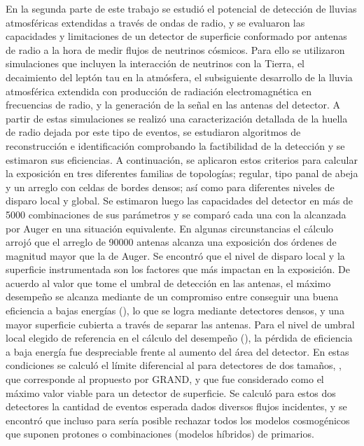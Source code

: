En la segunda parte de este trabajo se estudi\'o el potencial de detecci\'on de  lluvias atmosf\'ericas extendidas a trav\'es de ondas de radio,
y se evaluaron las capacidades y limitaciones de un detector de superficie conformado por antenas de radio a la hora de medir flujos de neutrinos c\'osmicos.
Para ello se utilizaron simulaciones que incluyen la interacci\'on de neutrinos con la Tierra, el decaimiento del lept\'on tau en la atm\'osfera, el subsiguiente desarrollo de la lluvia atmosf\'erica extendida con producci\'on de radiaci\'on electromagn\'etica en frecuencias de radio, y la generaci\'on de la se\~nal en las antenas del detector.
A partir de estas simulaciones se realiz\'o una caracterizaci\'on detallada de la huella de radio dejada por este tipo de eventos, 
se estudiaron algoritmos de reconstrucci\'on e identificaci\'on comprobando la factibilidad de la detecci\'on y se estimaron sus eficiencias.
A continuaci\'on, se aplicaron estos criterios para calcular la exposici\'on en tres diferentes familias de topolog\'ias; regular, tipo panal de abeja y un arreglo con celdas de bordes densos; as\'i como para diferentes niveles de disparo local y global.
Se estimaron luego las capacidades del detector en m\'as de 5000 combinaciones de sus par\'ametros y se compar\'o cada una con la alcanzada por Auger en una situaci\'on equivalente.
En algunas circunstancias el c\'alculo arroj\'o que el arreglo de 90000 antenas alcanza una exposici\'on dos \'ordenes de magnitud mayor que la de Auger.
Se encontr\'o que el nivel de disparo local y la superficie instrumentada son los factores que m\'as impactan en la exposici\'on.
De acuerdo al valor que tome el umbral de detecci\'on en las antenas, el m\'aximo desempe\~no se alcanza mediante de un compromiso entre conseguir una buena eficiencia a bajas energ\'ias (), lo que se logra mediante detectores densos, y una mayor superficie cubierta a trav\'es de separar las antenas.
Para el nivel de umbral local elegido de referencia en el c\'alculo del desempe\~no (), la p\'erdida de eficiencia a baja energ\'ia fue despreciable frente al aumento del \'area del detector. 
En estas condiciones se calcul\'o el l\'imite diferencial al  para detectores de dos tama\~nos, , que corresponde al propuesto por GRAND, y  que fue considerado como el m\'aximo valor viable para un detector de superficie.
Se calcul\'o para estos dos detectores la cantidad de eventos esperada dados diversos flujos incidentes, y se encontr\'o que incluso para  ser\'ia posible rechazar todos los modelos cosmog\'enicos que suponen protones o combinaciones (modelos h\'ibridos) de primarios.
